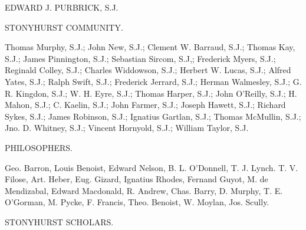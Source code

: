 EDWARD J. PURBRICK, S.J.

STONYHURST COMMUNITY.

Thomas Murphy, S.J.; John New, S.J.; Clement W.
Barraud, S.J.; Thomas Kay, S.J.; James Pinnington, S.J.; Sebastian
Sircom, S.J,; Frederick Myers, S.J.; Reginald Colley, S.J.; Charles
Widdowson, S.J.; Herbert W. Lucas, S.J.; Alfred Yates, S.J.; Ralph
Swift, S.J.; Frederick Jerrard, S.J.; Herman Walmesley, S.J.; G. R.
Kingdon, S.J.; W. H. Eyre, S.J.; Thomas Harper, S.J.; John O'Reilly,
S.J.; H. Mahon, S.J.; C. Kaelin, S.J.; John Farmer, S.J.; Joseph
Hawett, S.J.; Richard Sykes, S.J.; James Robinson, S.J.; Ignatius
Gartlan, S.J.; Thomas McMullin, S.J.; Jno. D. Whitney, S.J.; Vincent
Hornyold, S.J.; William Taylor, S.J.

PHILOSOPHERS.

Geo. Barron, Louis Benoist, Edward Nelson, B. L. O'Donnell,
T. J. Lynch. T. V. Filose, Art. Heber, Eug. Gizard, Ignatius Rhodes,
Fernand Guyot, M. de Mendizabal, Edward Macdonald, R. Andrew, Chas.
Barry, D. Murphy, T. E. O'Gorman, M. Pycke, F. Francis, Theo. Benoist,
W. Moylan, Jos. Scully.

STONYHURST SCHOLARS.

